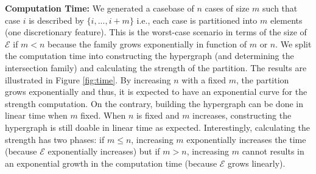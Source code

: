 \documentclass[sigconf,edbt]{acmart-edbt-workshops}
\begin{document}
\noindent
{\bf Computation Time:} We generated a casebase of $n$ cases of size $m$ such that case $i$ is described by $\{i, ...,  i+m\}$ i.e., each case is partitioned into $m$ elements (one discretionary feature). This is the worst-case scenario in terms of the size of $\mathcal{E}$ if $m < n$ because the family grows exponentially in function of $m$ or $n$. We split the computation time into constructing the hypergraph (and determining the intersection family) and calculating the strength of the partition. The results are illustrated in Figure \ref{fig:time}. By increasing $n$ with a fixed $m$, the partition grows exponentially and thus, it is expected to have an exponential curve for the strength computation. On the contrary, building the hypergraph can be done in linear time when $m$ fixed. When $n$ is fixed and $m$ increases, constructing the hypergraph is still doable in linear time as expected. Interestingly, calculating the strength has two phases: if $m \leq n$, increasing $m$ exponentially increases the time (because $\mathcal{E}$ exponentially increases) but if $m > n$, increasing $m$ cannot results in an exponential growth in the computation time (because $\mathcal{E}$ grows linearly).
\end{document}
